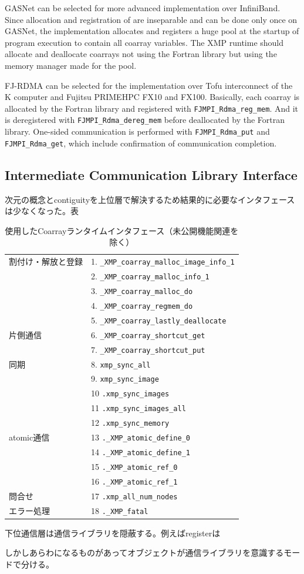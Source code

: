 GASNet can be selected for more advanced implementation over InfiniBand. 
Since allocation and registration of are inseparable and can be done only once 
on GASNet, the implementation allocates and registers a huge pool at the startup 
of program execution to contain all coarray variables. 
The XMP runtime should allocate and deallocate coarrays not using the Fortran 
library but using the memory manager made for the pool.

FJ-RDMA can be selected for the implementation over Tofu interconnect of the K computer 
and Fujitsu PRIMEHPC FX10 and FX100. Basically, each coarray is allocated by the Fortran 
library and registered with {\tt FJMPI\_Rdma\_reg\_mem}. And it is deregistered with 
{\tt FJMPI\_Rdma\_dereg\_mem} before deallocated by the Fortran library. 
One-sided communication is performed with {\tt FJMPI\_Rdma\_put} and {\tt FJMPI\_Rdma\_get}, 
which include confirmation of communication completion.


\subsection{Intermediate Communication Library Interface}


次元の概念とcontiguityを上位層で解決するため結果的に必要なインタフェースは少なくなった。表

\begin{table}
 \begin{center}
  \caption{使用したCoarrayランタイムインタフェース（未公開機能関連を除く）}
  \begin{tabular}{|l|l|}
\hline
割付け・解放と登録
& 1. \verb|_XMP_coarray_malloc_image_info_1|\\
& 2. \verb|_XMP_coarray_malloc_info_1|\\
& 3. \verb|_XMP_coarray_malloc_do|\\
& 4. \verb|_XMP_coarray_regmem_do|\\
& 5. \verb|_XMP_coarray_lastly_deallocate|\\
\hline
片側通信
& 6. \verb|_XMP_coarray_shortcut_get|\\
& 7. \verb|_XMP_coarray_shortcut_put|\\
\hline
同期
& 8. \verb|xmp_sync_all|\\
& 9. \verb|xmp_sync_image|\\
& 10 \verb|.xmp_sync_images|\\
& 11 \verb|.xmp_sync_images_all|\\
& 12 \verb|.xmp_sync_memory|\\
\hline
atomic通信
& 13 \verb|._XMP_atomic_define_0|\\
& 14 \verb|._XMP_atomic_define_1|\\
& 15 \verb|._XMP_atomic_ref_0|\\
& 16 \verb|._XMP_atomic_ref_1|\\
\hline
問合せ
& 17 \verb|.xmp_all_num_nodes|\\
\hline
エラー処理
& 18 \verb|._XMP_fatal|\\
\hline
  \end{tabular}
 \end{center}
\end{table}


下位通信層は通信ライブラリを隠蔽する。例えばregisterは

しかしあらわになるものがあってオブジェクトが通信ライブラリを意識するモードで分ける。

